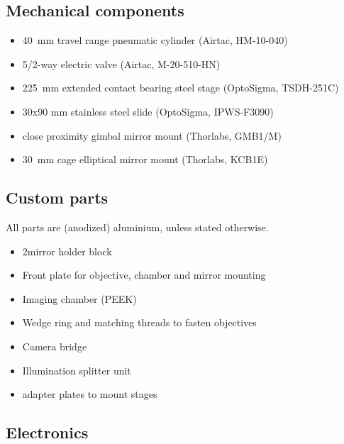 \begin{singlespace}
\subsection*{Mechanical components}
  \begin{itemize}
    \item \SI{40}{mm} travel range pneumatic cylinder (Airtac, HM-10-040)
    \item 5/2-way electric valve (Airtac, M-20-510-HN)
    \item 2\texttimes \SI{25}{mm} extended contact bearing steel stage (OptoSigma,  TSDH-251C)
    \item 30x90 mm stainless steel slide (OptoSigma,  IPWS-F3090)
    \item close proximity gimbal mirror mount (Thorlabs, GMB1/M)
    \item \SI{30}{mm} cage elliptical mirror mount (Thorlabs, KCB1E)
  \end{itemize}

\subsection*{Custom parts}
  All parts are (anodized) aluminium, unless stated otherwise.
  \begin{itemize}
    \item 2\texttimes mirror holder block
    \item Front plate for objective, chamber and mirror mounting
    \item Imaging chamber (PEEK)
    \item Wedge ring and matching threads to fasten objectives
    \item Camera bridge
    \item Illumination splitter unit
    \item adapter plates to mount stages
  \end{itemize}

\subsection*{Electronics}


\end{singlespace}
